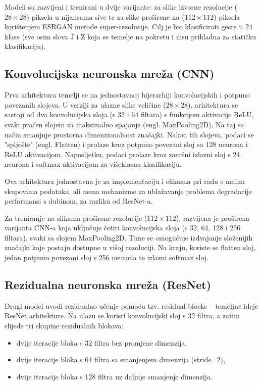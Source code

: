 \documentclass[a4paper,twocolumn]{article}
\begin{document}
Modeli su razvijeni i trenirani u dvije varijante: za slike izvorne rezolucije ($28 \times 28$) piksela u nijansama sive te za slike proširene na ($112 \times 112$) piksela korištenjem ESRGAN metode super-rezolucije. Cilj je bio klasificirati geste u 24 klase (sve osim slova J i Z koja se temelje na pokretu i nisu prikladna za statičku klasifikaciju).

\subsection{Konvolucijska neuronska mreža (CNN)}

Prva arhitektura temelji se na jednostavnoj hijerarhiji konvolucijskih i potpuno povezanih slojeva. U verziji za ulazne slike veličine ($28 \times 28$), arhitektura se sastoji od dva konvolucijska sloja (s 32 i 64 filtara) s funkcijom aktivacije ReLU, svaki praćen slojem za maksimalno spajanje (engl. MaxPooling2D). Na taj se način smanjuje prostorna dimenzionalnost značajki. Nakon tih slojeva, podaci se "spljošte" (engl. Flatten) i prolaze kroz potpuno povezani sloj sa 128 neurona i ReLU aktivacijom. Naposljetku, podaci prolaze kroz završni izlazni sloj s 24 neurona i softmax aktivacijom za višeklasnu klasifikaciju.

Ova arhitektura jednostavna je za implementaciju i efikasna pri radu s malim skupovima podataka, ali nema mehanizme za ublažavanje problema degradacije performansi s dubinom, za razliku od ResNet-a.

Za treniranje na slikama proširene rezolucije ($112 \times 112$), razvijena je proširena varijanta CNN-a koja uključuje četiri konvolucijska sloja (s 32, 64, 128 i 256 filtara), svaki sa slojem MaxPooling2D. Time se omogućuje izdvajanje složenijih značajki koje postaju dostupne u višoj rezoluciji. Na kraju, koriste se flatten sloj, jedan potpuno povezani sloj s 256 neurona te izlazni softmax sloj.

\subsection{Rezidualna neuronska mreža (ResNet)}

Drugi model uvodi rezidualno učenje pomoću tzv. residual blocks – temeljne ideje ResNet arhitekture. Na ulazu se koristi konvolucijski sloj s 32 filtra, a zatim slijede tri skupine rezidualnih blokova:

\begin{itemize}
\item dvije iteracije bloka s 32 filtra bez promjene dimenzija,
\item dvije iteracije bloka s 64 filtra sa smanjenjem dimenzija (stride=2),
\item dvije iteracije bloka s 128 filtra uz daljnje smanjenje dimenzija.
\end{itemize}
\end{document}
